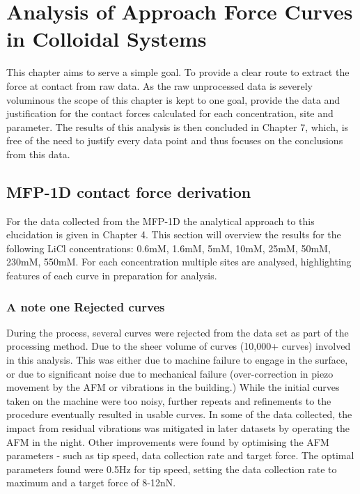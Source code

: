 


\chapter{Analysis of Approach Force Curves in Colloidal Systems}
\label{chap:approach_force_curves}

This chapter aims to serve a simple goal. To provide a clear route to extract the force at contact from raw data.  As the raw unprocessed data is severely voluminous the scope of this chapter is kept to one goal, provide the data and justification for the contact forces calculated for each concentration, site and parameter. The results of this analysis is then concluded in Chapter 7, which, is free of the need to justify every data point and thus focuses on the conclusions from this data. 

\section{MFP-1D contact force derivation}

For the data collected from the MFP-1D the analytical approach to this elucidation is given in Chapter 4. This section will overview the results for the following LiCl concentrations: 0.6mM, 1.6mM, 5mM, 10mM, 25mM, 50mM, 230mM, 550mM. For each concentration multiple sites are analysed, highlighting features of each curve in preparation for analysis. 

\subsection{A note one Rejected curves}

 During the process, several curves were rejected from the data set as part of the processing method. Due to the sheer volume of curves (10,000+ curves) involved in this analysis.  This was either due to machine failure to engage in the surface, or due to significant noise due to mechanical failure (over-correction in piezo movement by the AFM or vibrations in the building.) While the initial curves taken on the machine were too noisy, further repeats and refinements to the procedure eventually resulted in usable curves. In some of the data collected, the impact from residual vibrations was mitigated in later datasets by operating the AFM in the night. Other improvements were found by optimising the AFM parameters  - such as tip speed, data collection rate and target force. The optimal parameters found were 0.5Hz for tip speed, setting the data collection rate to maximum and a target force of 8-12nN. 

